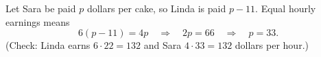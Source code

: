 Let Sara be paid $p$ dollars per cake, so Linda is paid $p-11$. Equal hourly earnings means
\[
6(p-11)=4p\quad\Longrightarrow\quad 2p=66\quad\Longrightarrow\quad p=\boxed{33}.
\]
(Check: Linda earns $6\cdot22=132$ and Sara $4\cdot33=132$ dollars per hour.)
